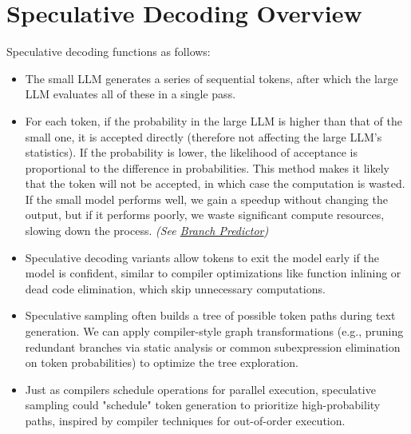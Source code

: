 \documentclass[draft,a4paper,12pt]{report}
\begin{document}
\section{Speculative Decoding Overview}
Speculative decoding functions as follows:
\begin{itemize}
\item The small LLM generates a series of sequential tokens, after which the large LLM evaluates all of these in a single pass.
\item For each token, if the probability in the large LLM is higher than that of the small one, it is accepted directly (therefore not affecting the large LLM's statistics). If the probability is lower, the likelihood of acceptance is proportional to the difference in probabilities. This method makes it likely that the token will not be accepted, in which case the computation is wasted. If the small model performs well, we gain a speedup without changing the output, but if it performs poorly, we waste significant compute resources, slowing down the process. \emph{(See \href{https://en.wikipedia.org/wiki/Branch_predictor}{Branch Predictor})}
\item Speculative decoding variants allow tokens to exit the model early if the model is confident, similar to compiler optimizations like function inlining or dead code elimination, which skip unnecessary computations.
\item Speculative sampling often builds a tree of possible token paths during text generation. We can apply compiler-style graph transformations (e.g., pruning redundant branches via static analysis or common subexpression elimination on token probabilities) to optimize the tree exploration.
\item Just as compilers schedule operations for parallel execution, speculative sampling could "schedule" token generation to prioritize high-probability paths, inspired by compiler techniques for out-of-order execution.
\end{itemize}
\end{document}
